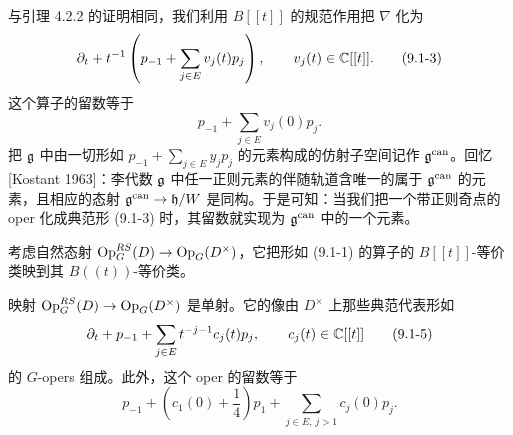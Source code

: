 与引理 4.2.2 的证明相同，我们利用 $B[[t]]$ 的规范作用把 $\nabla$ 化为
\begin{equation}
\partial_t + t^{-1}\left(p_{-1} + \sum_{j\in E}v_j(t)p_j\right),\qquad v_j(t)\in\mathbb{C}[[t]].
\tag{9.1-3}
\end{equation}
这个算子的留数等于
\begin{equation}
p_{-1} + \sum_{j\in E}v_j(0)p_j.
\tag{9.1-4}
\end{equation}
把 $\mathfrak{g}$ 中由一切形如 $p_{-1}+\sum_{j\in E}y_jp_j$ 的元素构成的仿射子空间记作 $\mathfrak{g}^{\mathrm{can}}$。回忆 [Kostant 1963]：李代数 $\mathfrak{g}$ 中任一正则元素的伴随轨道含唯一的属于 $\mathfrak{g}^{\mathrm{can}}$ 的元素，且相应的态射 $\mathfrak{g}^{\mathrm{can}}\to\mathfrak{h}/W$ 是同构。于是可知：当我们把一个带正则奇点的 oper 化成典范形 (9.1-3) 时，其留数就实现为 $\mathfrak{g}^{\mathrm{can}}$ 中的一个元素。


考虑自然态射 $\operatorname{Op}^{RS}_G(D)\to\operatorname{Op}_G(D^\times)$，它把形如 (9.1-1) 的算子的 $B[[t]]$-等价类映到其 $B((t))$-等价类。

\begin{proposition}
映射 $\operatorname{Op}^{RS}_G(D)\to\operatorname{Op}_G(D^\times)$ 是单射。它的像由 $D^\times$ 上那些典范代表形如
\begin{equation}
\partial_t + p_{-1} + \sum_{j\in E}t^{-j-1}c_j(t)p_j,\qquad c_j(t)\in\mathbb{C}[[t]]
\tag{9.1-5}
\end{equation}
的 $G$-opers 组成。此外，这个 oper 的留数等于
\begin{equation}
p_{-1} + \left(c_1(0)+\frac{1}{4}\right)p_1 + \sum_{j\in E,\,j>1}c_j(0)p_j.
\tag{9.1-6}
\end{equation}
\end{proposition}

